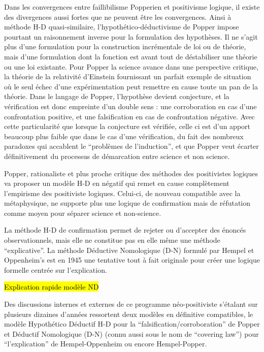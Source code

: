 Dans les convergences entre faillibilisme Popperien et positivisme logique, il existe des divergences aussi fortes que ne peuvent être les convergences. Ainsi à méthode H-D quasi-similaire, l'hypothético-déductivisme de Popper impose pourtant un raisonnement inverse pour la formulation des hypothèses. Il ne s'agit plus d'une formulation pour la construction incrémentale de loi ou de théorie, mais d'une formulation dont la fonction est avant tout de déstabiliser une théorie ou une loi existante. Pour Popper la science avance dans une perspective critique, la théorie de la relativité d'Einstein fournissant un parfait exemple de situation où le seul échec d'une expérimentation peut remettre en cause toute un pan de la théorie. Dans le langage de Popper, l'hypothèse devient conjecture, et la vérification est donc empreinte d'un double sens : une corroboration en cas d'une confrontation positive, et une falsification en cas de confrontation négative. Avec cette particularité que lorsque la conjecture est vérifiée, celle ci est d'un apport beaucoup plus faible que dans le cas d'une vérification, du fait des nombreux paradoxes qui accablent le \enquote{problèmes de l'induction}, et que Popper veut écarter définitivement du processus de démarcation entre science et non science.

Popper, rationaliste et plus proche critique des méthodes des positivistes logiques va proposer un modèle H-D en négatif qui remet en cause complètement l'empirisme des positiviste logiques. Celui-ci, de nouveau compatible avec la métaphysique, ne supporte plus une logique de confirmation mais de réfutation comme moyen pour séparer science et non-science.

La méthode H-D de confirmation permet de rejeter ou d'accepter des énoncés observationnels, mais elle ne constitue pas en elle même une méthode \enquote{explicative}. La méthode Déductive Nomologique (D-N) formulé par Hempel et Oppenheim’s  est en 1945 une tentative tout à fait originale pour créer une logique formelle centrée sur l'explication.

\hl{Explication rapide modèle ND}

Des discussions internes et externes de ce programme néo-positiviste s'étalant sur plusieurs dizaines d'années ressortent deux modèles en définitive compatibles, le modèle Hypothético Déductif H-D pour la \enquote{falsification/corroboration} de Popper et Déductif Nomologique (D-N) (connu aussi sous le nom de \foreignquote{english}{covering law}) pour \enquote{l'explication} de Hempel-Oppenheim ou encore Hempel-Popper.

